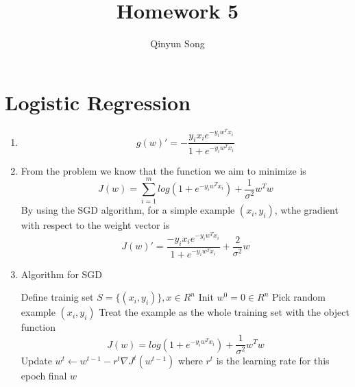 \documentclass{article}
\title{Homework 5}
\author{Qinyun Song}
\date{}
\begin{document}
	\maketitle

	\section{Logistic Regression}
		\begin{enumerate}
		\item \begin{equation}
			g(w)' = -\frac{y_ix_ie^{-y_iw^Tx_i}}{1 + e^{-y_iw^Tx_i}}
		\end{equation}
		\item From the problem we know that the function we aim to minimize is \begin{equation}
			J(w) = \sum_{i = 1}^m{log(1 + e^{-y_iw^Tx_i}) + \frac{1}{\sigma^2}w^Tw}
		\end{equation} By using the SGD algorithm, for a simple example $(x_i, y_i)$, wthe gradient with respect to the weight vector is \begin{equation}
			J(w)' = \frac{-y_ix_ie^{-y_iw^Tx_i}}{1 + e^{-y_iw^Tx_i}} + \frac{2}{\sigma^2}w
		\end{equation}
		\item \begin{algorithm} [H]
			\caption{Algorithm for SGD}
			\begin{algorithmic}[1]
			\State Define trainig set $S = \{(x_i, y_i)\}, x\in R^n$
			\State Init $w^0 = 0 \in R^n$
				\State Pick random example $(x_i, y_i)$
				\State Treat the example as the whole training set with the object function \begin{equation}
					J(w) = {log(1 + e^{-y_iw^Tx_i}) + \frac{1}{\sigma^2}w^Tw}
				\end{equation}
				\State Update $w^t \leftarrow w^{t- 1} - r^t \nabla J^t(w^{t - 1})$ where $r^t$ is the learning rate for this epoch
			\EndFor
			\State \Return final $w$
			\end{algorithmic}
		\end{algorithm}
		\end{enumerate}
\end{document}

